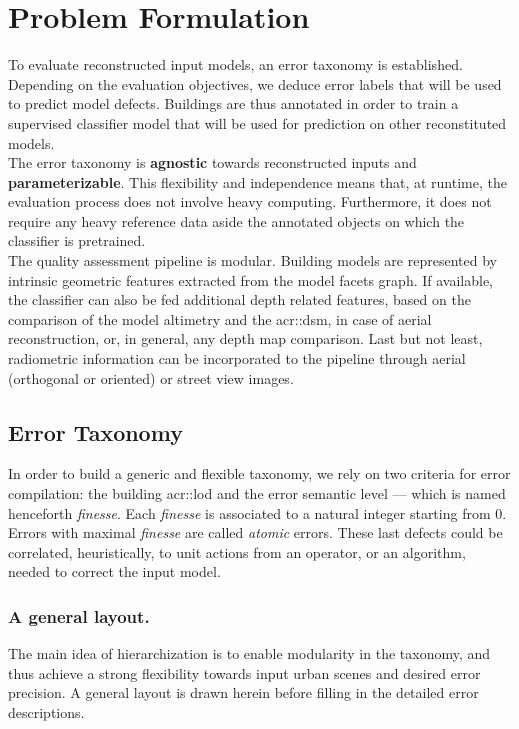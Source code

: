 \documentclass[runningheads]{llncs}
\begin{document}
\section{Problem Formulation}

To evaluate reconstructed input models, an error taxonomy is established. Depending on the evaluation objectives, we deduce error labels that will be used to predict model defects. Buildings are thus annotated in order to train a supervised classifier model that will be used for prediction on other reconstituted models.\\

The error taxonomy is \textbf{agnostic} towards reconstructed inputs and \textbf{parameterizable}. This flexibility and independence means that, at runtime, the evaluation process does not involve heavy computing. Furthermore, it does not require any heavy reference data aside the annotated objects on which the classifier is pretrained.\\

The quality assessment pipeline is modular. Building models are represented by intrinsic geometric features extracted from the model facets graph. If available, the classifier can also be fed additional depth related features, based on the comparison of the model altimetry and the \acrshort{acr::dsm}, in case of aerial reconstruction, or, in general, any depth map comparison. Last but not least, radiometric information can be incorporated to the pipeline through aerial (orthogonal or oriented) or street view images.

\subsection{Error Taxonomy}
In order to build a generic and flexible taxonomy, we rely on two criteria for error compilation: the building \acrshort{acr::lod} and the error semantic level --- which is named henceforth \textit{finesse}. Each \textit{finesse} is associated to a natural integer starting from $0$. Errors with maximal \textit{finesse} are called \textit{atomic} errors. These last defects could be correlated, heuristically, to unit actions from an operator, or an algorithm, needed to correct the input model.

\subsubsection{A general layout.}
The main idea of hierarchization is to enable modularity in the taxonomy, and thus achieve a strong flexibility towards input urban scenes and desired error precision. A general layout is drawn herein before filling in the detailed error descriptions.\\
\end{document}
